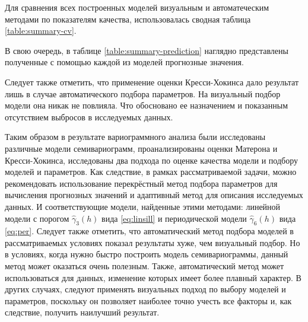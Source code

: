 Для сравнения всех построенных моделей визуальным и автоматеческим методами по показателям качества, использовалась сводная таблица \ref{table:summary-cv}.


В свою очередь, в таблице \ref{table:summary-prediction} наглядно представлены полученные с помощью каждой из моделей прогнозные значения.


Следует также отметить, что применение оценки Кресси-Хокинса дало результат лишь в случае автоматического подбора параметров. На визуальный подбор модели она никак не повлияла. Что обосновано ее назначением и показанным отсутствием выбросов в исследуемых данных.

Таким образом в результате вариограммного анализа были исследованы различные модели семивариограмм, проанализированы оценки Матерона и Кресси-Хокинса, исследованы два подхода по оценке качества модели и подбору моделей и параметров. Как следствие, в рамках рассматриваемой задачи, можно рекомендовать использование перекрёстный метод подбора параметров  для вычисления прогнозных значений и адаптивный метод для описания исследуемых данных. И соответствующие модели, найденные этими методами: линейной модели с порогом $ \widehat{\gamma}_3(h) $ вида \eqref{eq:linsill} и периодической модели $ \widehat{\gamma}_6(h) $ вида \eqref{eq:per}. Следует также отметить, что автоматический метод подбора моделей в рассматриваемых условиях показал результаты хуже, чем визуальный подбор. Но в условиях, когда нужно быстро построить модель семивариограммы, данный метод может оказаться очень полезным. Также, автоматический метод может использоваться для данных, изменение которых имеет более плавный характер. В других случаях, следуют применять визуальных подход по выбору моделей и параметров, поскольку он позволяет наиболее точно учесть все факторы и, как следствие, получить наилучший результат.


